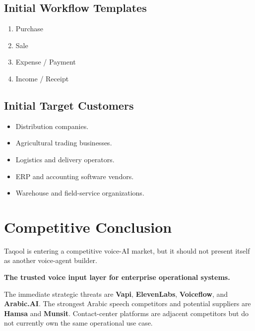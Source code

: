 \documentclass[10.5pt,a4paper]{article}
\newcommand{\BrandName}{Taqool}
\begin{document}
\subsection{Initial Workflow Templates}

\begin{enumerate}
  \item Purchase
  \item Sale
  \item Expense / Payment
  \item Income / Receipt
\end{enumerate}

\subsection{Initial Target Customers}

\begin{itemize}
  \item Distribution companies.
  \item Agricultural trading businesses.
  \item Logistics and delivery operators.
  \item ERP and accounting software vendors.
  \item Warehouse and field-service organizations.
\end{itemize}

\section{Competitive Conclusion}

\BrandName{} is entering a competitive voice-AI market, but it should not
present itself as another voice-agent builder.

\begin{positionbox}
\begin{center}
\textbf{The trusted voice input layer for enterprise operational systems.}
\end{center}
\end{positionbox}

The immediate strategic threats are \textbf{Vapi}, \textbf{ElevenLabs},
\textbf{Voiceflow}, and \textbf{Arabic.AI}. The strongest Arabic speech
competitors and potential suppliers are \textbf{Hamsa} and \textbf{Munsit}.
Contact-center platforms are adjacent competitors but do not currently own
the same operational use case.
\end{document}
